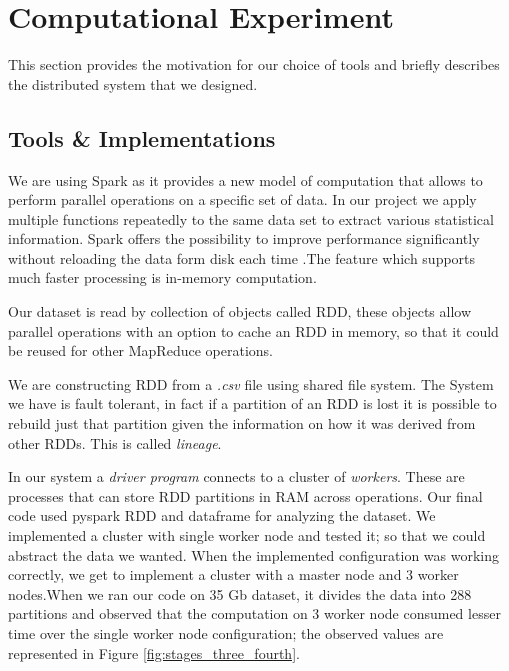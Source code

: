 \section{Computational Experiment}


This section provides the motivation for our choice of tools and briefly describes the distributed system that we designed. 

\subsection{Tools \& Implementations}
We are using Spark as it provides a new model of computation that allows to perform parallel operations on a specific set of data. In our project we apply multiple functions repeatedly to the same data set to extract various statistical information. Spark offers the possibility to improve performance significantly without reloading the data form disk each time \cite{Sparkzaharia}.The feature which supports much faster processing is in-memory computation.

Our dataset is read by collection of objects called RDD, these objects allow parallel operations with an option to cache an RDD in memory, so that it could be reused for other MapReduce operations. 

We are constructing RDD from a \textit{.csv} file using shared file system. The System we have is fault tolerant, in fact if a partition of an RDD is lost it is possible to rebuild just that partition given the information on how it was derived from other RDDs. This is called \textit{lineage}\cite{Sparkzaharia}.

In our system a \textit{driver program} connects to a cluster of \textit{workers}. These are processes that can store RDD partitions in RAM across operations\cite{RDD}.\newline
Our final code used pyspark RDD and dataframe for analyzing the dataset. We implemented a cluster with single worker node and tested it; so that we could abstract the data we wanted. When the implemented configuration was working correctly, we get to implement a cluster with a master node and 3 worker nodes.When we ran our code on 35 Gb dataset, it divides the data into 288 partitions and observed that the computation on 3 worker node consumed lesser time over the single worker node configuration; the observed values are represented in Figure \ref{fig:stages_three_fourth}. 

